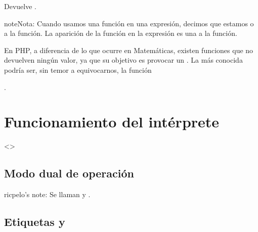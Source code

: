 \documentclass[a4paper,12pt,spanish]{sphinxmanual}
\begin{document}
\begin{sphinxVerbatim}[commandchars=\\\{\}]
   
\end{sphinxVerbatim}

Devuelve .

\begin{sphinxadmonition}{note}{Nota:}
Cuando usamos una función en una expresión, decimos que estamos  o
 a la función. La aparición de la función en la expresión es una
 a la función.
\end{sphinxadmonition}

\ignorespaces 
En PHP, a diferencia de lo que ocurre en Matemáticas, existen funciones que no
devuelven ningún valor, ya que su objetivo es provocar un . La
más conocida podría ser, sin temor a equivocarnos, la función %
\begin{footnote}[5]\sphinxAtStartFootnote
{}
%
\end{footnote}.


\section{Funcionamiento del intérprete}
\label{\detokenize{php:var-dump}}\label{\detokenize{php:funcionamiento-del-interprete}}
\textless{}\textgreater{}


\subsection{Modo dual de operación}
\label{\detokenize{php:modo-dual-de-operacion}}
ricpelo’s note: Se llaman  y .


\subsection{Etiquetas  y }
\label{\detokenize{php:etiquetas-php-y}}
\end{document}
